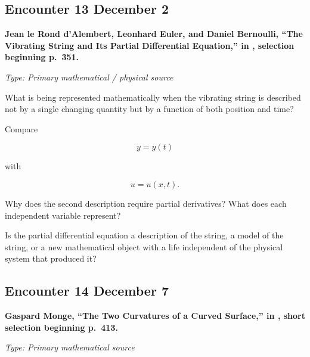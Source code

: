 \subsection*{Encounter 13 \hfill December 2}

\textbf{Jean le Rond d'Alembert, Leonhard Euler, and Daniel Bernoulli,
``The Vibrating String and Its Partial Differential Equation,''
in \textcite{struik1986}, selection beginning p.~351.}

\textit{Type: Primary mathematical / physical source}

\begin{description}[leftmargin=1.15in,style=nextline]

\item[\textcolor{LangRed}{READ}]
What is being represented mathematically when the vibrating string is
described not by a single changing quantity but by a function of both
position and time?

\item[\textcolor{LangRed}{CONNECT}]
Compare

\[
y=y(t)
\]

with

\[
u=u(x,t).
\]

Why does the second description require partial derivatives? What
does each independent variable represent?

\item[\textcolor{LangRed}{QUESTION}]
Is the partial differential equation a description of the string,
a model of the string, or a new mathematical object with a life
independent of the physical system that produced it?

\end{description}



\subsection*{Encounter 14 \hfill December 7}

\textbf{Gaspard Monge, ``The Two Curvatures of a Curved Surface,''
in \textcite{struik1986}, short selection beginning p.~413.}

\textit{Type: Primary mathematical source}

